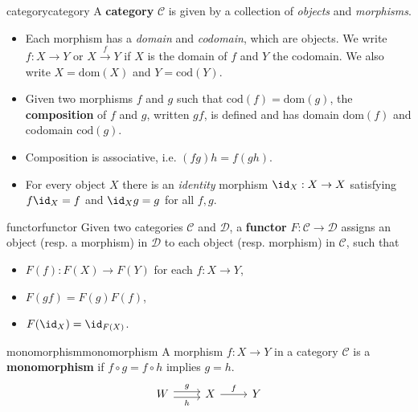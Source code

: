\begin{topic}{category}{category}
    A \textbf{category} $\mathcal{C}$ is given by a collection of \textit{objects} and \textit{morphisms}.
    \begin{itemize}
        \item Each morphism has a \textit{domain} and \textit{codomain}, which are objects. We write $f : X \to Y$ or $X \overset{f}{\to} Y$ if $X$ is the domain of $f$ and $Y$ the codomain. We also write $X = \text{dom}(X)$ and $Y = \text{cod}(Y)$.
        
        \item Given two morphisms $f$ and $g$ such that $\text{cod}(f) = \text{dom}(g)$, the \textbf{composition} of $f$ and $g$, written $gf$, is defined and has domain $\text{dom}(f)$ and codomain $\text{cod}(g)$.
        
        \item Composition is associative, i.e. $(fg)h = f(gh)$.
        
        \item For every object $X$ there is an \textit{identity} morphism $\id_X : X \to X$ satisfying $f \id_X = f$ and $\id_X g = g$ for all $f, g$.
    \end{itemize}
\end{topic}

\begin{topic}{functor}{functor}
    Given two categories $\mathcal{C}$ and $\mathcal{D}$, a \textbf{functor} $F : \mathcal{C} \to \mathcal{D}$ assigns an object (resp. a morphism) in $\mathcal{D}$ to each object (resp. morphism) in $\mathcal{C}$, such that
    \begin{itemize}
        \item $F(f) : F(X) \to F(Y)$ for each $f : X \to Y$,
        \item $F(gf) = F(g) F(f)$,
        \item $F(\id_X) = \id_{F(X)}$.
    \end{itemize}
\end{topic}

\begin{topic}{monomorphism}{monomorphism}
    A morphism $f : X \to Y$ in a category $\mathcal{C}$ is a \textbf{monomorphism} if $f \circ g = f \circ h$ implies $g = h$.
    \[ \begin{tikzcd} W \arrow[shift left=0.25em]{r}{g} \arrow[shift right=0.25em, swap]{r}{h} & X \arrow{r}{f} & Y \end{tikzcd} \]
\end{topic}

